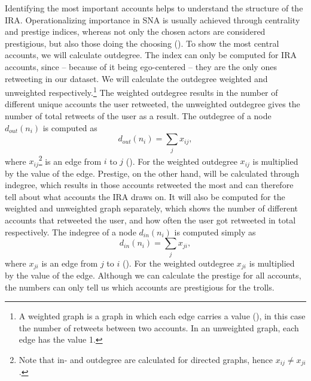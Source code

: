 \documentclass[12pt, titlepage=true, toc=bib]{scrartcl}
\begin{document}
Identifying the most important accounts helps to understand the structure of the IRA. Operationalizing importance in SNA is usually achieved through centrality and prestige indices, whereas not only the chosen actors are considered prestigious, but also those doing the choosing (\cite[170]{wasserman_social_1994}). To show the most central accounts, we will calculate outdegree. The index can only be computed for IRA accounts, since -- because of it being ego-centered -- they are the only ones retweeting in our dataset. We will calculate the outdegree weighted and unweighted respectively.\footnote{A weighted graph is a graph in which each edge carries a value (\cite[140]{wasserman_social_1994}), in this case the number of retweets between two accounts. In an unweighted graph, each edge has the value 1.} The weighted outdegree results in the number of different unique accounts the user retweeted, the unweighted outdegree gives the number of total retweets of the user as a result. The outdegree of a node \( d_{out}(n_{i}) \) is computed as \[ d_{out}(n_{i}) = \sum_{j} x_{ij} ,\] where \( x_{ij} \)\footnote{Note that in- and outdegree are calculated for directed graphs, hence \( x_{ij} \neq x_{ji} \).} is an edge from \( i \) to \( j \) (\cite[cf.][178]{wasserman_social_1994}). For the weighted outdegree \( x_{ij} \) is multiplied by the value of the edge. Prestige, on the other hand, will be calculated through indegree, which results in those accounts retweeted the most and can therefore tell about what accounts the IRA draws on. It will also be computed for the weighted and unweighted graph separately, which shows the number of different accounts that retweeted the user, and how often the user got retweeted in total respectively. The indegree of a node \( d_{in}(n_{i}) \) is computed simply as \[ d_{in}(n_{i}) = \sum_{j} x_{ji} ,\] where \( x_{ji} \) is an edge from \( j \) to \( i \) (\cite[cf.][202]{wasserman_social_1994}). For the weighted outdegree \( x_{ji} \) is multiplied by the value of the edge. Although we can calculate the prestige for all accounts, the numbers can only tell us which accounts are prestigious for the trolls.
\end{document}
